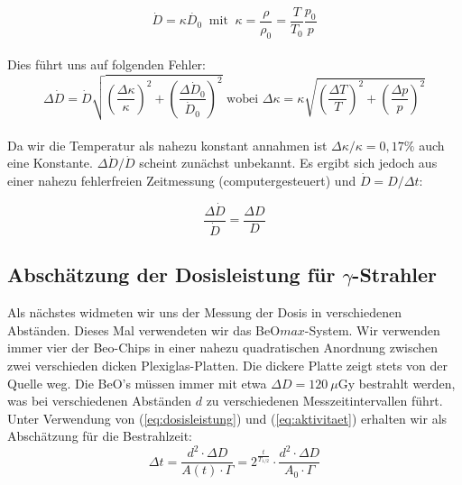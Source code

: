 \begin{equation*}
        \dot D = \kappa \dot{D_0} \ \text{ mit } \ \kappa = \frac{\rho}{\rho_0} = \frac{T}{T_0} \frac{p_0}{p}
\end{equation*}
\ \\
Dies führt uns auf folgenden Fehler:
\begin{equation*}
    \Delta \dot D = \dot D \sqrt{\left(\frac{\Delta \kappa}{\kappa}\right)^2 + \left( \frac{\Delta \dot D_0}{\dot D_0}\right)^2} \text{ wobei } \Delta \kappa = \kappa \sqrt{\left(\frac{\Delta T}{T}\right)^2 + \left(\frac{\Delta p}{p}\right)^2}
\end{equation*}
\ \\
Da wir die Temperatur als nahezu konstant annahmen ist $\Delta \kappa / \kappa = 0,17\%$ auch eine Konstante. $\Delta \dot D / \dot D$ scheint zunächst unbekannt. Es ergibt sich jedoch aus einer nahezu fehlerfreien Zeitmessung (computergesteuert) und $\dot D = D/\Delta t$:

\begin{equation*}
    \frac{\Delta \dot D}{\dot D} =  \frac{\Delta D}{D}
\end{equation*}

\subsection{Abschätzung der Dosisleistung für $\gamma$-Strahler}

Als nächstes widmeten wir uns der Messung der Dosis in verschiedenen Abständen. Dieses Mal verwendeten wir das BeO$max$-System. Wir verwenden immer vier der Beo-Chips in einer nahezu quadratischen Anordnung zwischen zwei verschieden dicken Plexiglas-Platten. Die dickere Platte zeigt stets von der Quelle weg.
Die BeO's müssen immer mit etwa $\Delta D = 120\ \mu$Gy bestrahlt werden, was bei verschiedenen Abständen $d$ zu verschiedenen Messzeitintervallen führt. Unter Verwendung von (\ref{eq:dosisleistung}) und (\ref{eq:aktivitaet}) erhalten wir als Abschätzung für die Bestrahlzeit:
\begin{equation}
		\Delta t 	= \frac{d^2 \cdot \Delta D}{A(t) \cdot \Gamma} 
					= 2^{\frac{t}{T_{1/2}}} \cdot \frac{d^2 \cdot \Delta D}{A_0 \cdot \Gamma} 
\end{equation}

